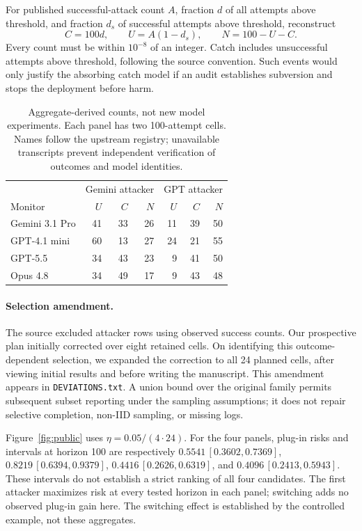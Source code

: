 \documentclass[10pt]{article}
\begin{document}
For published successful-attack count $A$, fraction $d$ of all attempts above threshold, and fraction $d_s$ of successful attempts above threshold, reconstruct
\begin{equation}C=100d,\qquad U=A(1-d_s),\qquad N=100-U-C.\end{equation}
Every count must be within $10^{-8}$ of an integer. Catch includes unsuccessful attempts above threshold, following the source convention. Such events would only justify the absorbing catch model if an audit establishes subversion and stops the deployment before harm.

\begin{table}[ht]\centering\small
\begin{tabular}{lrrr|rrr}\toprule
&\multicolumn{3}{c}{Gemini attacker}&\multicolumn{3}{c}{GPT attacker}\\
Monitor &$U$&$C$&$N$&$U$&$C$&$N$\\\midrule
Gemini 3.1 Pro &41&33&26&11&39&50\\
GPT-4.1 mini &60&13&27&24&21&55\\
GPT-5.5 &34&43&23&9&41&50\\
Opus 4.8 &34&49&17&9&43&48\\\bottomrule
\end{tabular}
\caption{Aggregate-derived counts, not new model experiments. Each panel has two 100-attempt cells. Names follow the upstream registry; unavailable transcripts prevent independent verification of outcomes and model identities.}\label{tab:counts}\end{table}

\paragraph{Selection amendment.}
The source excluded attacker rows using observed success counts. Our prospective plan initially corrected over eight retained cells. On identifying this outcome-dependent selection, we expanded the correction to all 24 planned cells, after viewing initial results and before writing the manuscript. This amendment appears in \texttt{DEVIATIONS.txt}. A union bound over the original family permits subsequent subset reporting under the sampling assumptions; it does not repair selective completion, non-IID sampling, or missing logs.

Figure~\ref{fig:public} uses $\eta=0.05/(4\cdot24)$. For the four panels, plug-in risks and intervals at horizon 100 are respectively $0.5541\,[0.3602,0.7369]$, $0.8219\,[0.6394,0.9379]$, $0.4416\,[0.2626,0.6319]$, and $0.4096\,[0.2413,0.5943]$. These intervals do not establish a strict ranking of all four candidates. The first attacker maximizes risk at every tested horizon in each panel; switching adds no observed plug-in gain here. The switching effect is established by the controlled example, not these aggregates.
\end{document}
